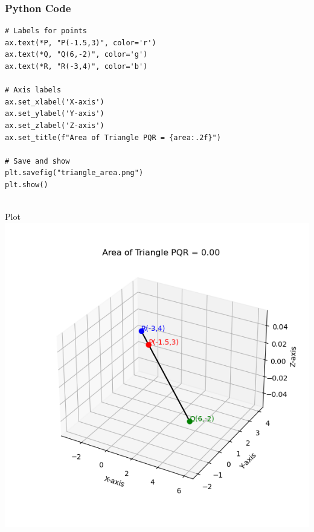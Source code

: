 \documentclass{beamer}
\begin{document}
\begin{frame}[fragile]
    \frametitle{Python Code}
    \begin{lstlisting}
# Labels for points
ax.text(*P, "P(-1.5,3)", color='r')
ax.text(*Q, "Q(6,-2)", color='g')
ax.text(*R, "R(-3,4)", color='b')

# Axis labels
ax.set_xlabel('X-axis')
ax.set_ylabel('Y-axis')
ax.set_zlabel('Z-axis')
ax.set_title(f"Area of Triangle PQR = {area:.2f}")

# Save and show
plt.savefig("triangle_area.png")
plt.show()


    \end{lstlisting}
\end{frame}

\begin{frame}{Plot}
    \centering
    \includegraphics[width=\columnwidth, height=0.8\textheight, keepaspectratio]{Beamer/figs/fig4.png}     
\end{frame}
\end{document}
